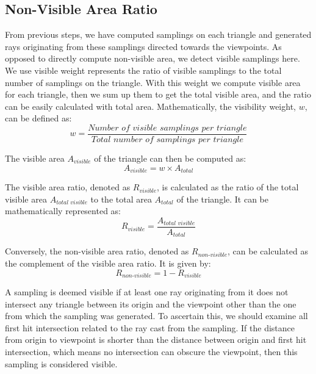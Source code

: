 \documentclass[11pt, a4paper,oneside,chapterprefix=false]{scrbook}
\begin{document}
\subsection{Non-Visible Area Ratio}

From previous steps, we have computed samplings on each triangle and generated rays originating from these samplings directed towards the viewpoints. As opposed to directly compute non-visible area, we detect visible samplings here. We use visible weight represents the ratio of visible samplings to the total number of samplings on the triangle. With this weight we compute visible area for each triangle, then we sum up them to get the total visible area, and the ratio can be easily calculated with total area. Mathematically, the visibility weight, \( w \), can be defined as:
\[ 
    w = \frac{\textit{Number of visible samplings per triangle}}{\textit{Total number of samplings per triangle}}
\]

The visible area \( A_{\textit{visible}} \) of the triangle can then be computed as:
\[ 
    A_{\textit{visible}} = w \times A_{\textit{total}}
\]

The visible area ratio, denoted as \( R_{\textit{visible}} \), is calculated as the ratio of the total visible area \( A_{\textit{total visible}} \) to the total area \( A_{\textit{total}} \) of the triangle. It can be mathematically represented as:
\[ 
    R_{\textit{visible}} = \frac{A_{\textit{total visible}}}{A_{\textit{total}}}
\]

Conversely, the non-visible area ratio, denoted as \( R_{\textit{non-visible}} \), can be calculated as the complement of the visible area ratio. It is given by:
\[ 
    R_{\textit{non-visible}} = 1 - R_{\textit{visible}}
\]

A sampling is deemed visible if at least one ray originating from it does not intersect any triangle between its origin and the viewpoint other than the one from which the sampling was generated. To ascertain this, we should examine all first hit intersection related to the ray cast from the sampling. If the distance from origin to viewpoint is shorter than the distance between origin and first hit intersection, which means no intersection can obscure the viewpoint, then this sampling is considered visible. 
\end{document}
